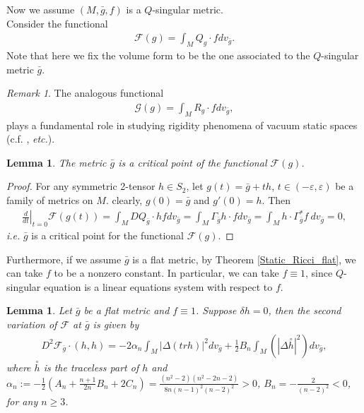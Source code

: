 \documentclass[12pt]{amsart}
\newtheorem{lemma}[theorem]{Lemma}
\theoremstyle{definition}
\theoremstyle{remark}
\newtheorem{remark}[theorem]{Remark}
\numberwithin{equation}{section}
\begin{document}
Now we assume $(M,\bar{g}, f)$ is a $Q$-singular metric.\\

Consider the functional
\begin{align*}
\mathscr{F}(g)=\int_M Q_g \cdot f dv_{\bar{g}}.
\end{align*}
Note that here we fix the volume form to be the one associated to the $Q$-singular metric $\bar{g}$.\\

\begin{remark}
The analogous functional
\begin{align*}
\mathscr{G}(g)=\int_M R_g \cdot f dv_{\bar{g}},
\end{align*}
plays a fundamental role in studying rigidity phenomena of vacuum static spaces (c.f. \cite{F-M, B-M, Q-Y_1}, \emph{etc.}).
\end{remark}

\begin{lemma}
The metric $\bar{g}$ is a critical point of the functional $\mathscr{F}(g)$.
\end{lemma}

\begin{proof}
For any symmetric 2-tensor $h \in S_2$, let $g(t) = \bar{g} + t h$, $t \in (-\varepsilon, \varepsilon)$ be a family of metrics on $M$. clearly, $g(0) = \bar{g}$ and $g'(0) = h$. Then
\begin{align*}
\left. \frac{d}{dt}\right|_{t=0} \mathscr{F}(g(t)) = \int_M DQ_{\bar{g}} \cdot h f dv_{\bar{g}} = \int_M \Gamma_{\bar{g}} h \cdot f dv_{\bar{g}} = \int_M h \cdot \Gamma_{\bar{g}}^* f \ dv_{\bar{g}} = 0,
\end{align*}
\emph{i.e.} $\bar{g}$ is a critical point for the functional $\mathscr{F}(g)$.
\end{proof}

Furthermore, if we assume $\bar{g}$ is a flat metric, by Theorem \ref{Static_Ricci_flat}, we can take $f$ to be a nonzero constant. In particular, we can take $f \equiv 1$, since $Q$-singular equation is a linear equations system with respect to $f$.\\

\begin{lemma}\label{2nd_variation_flat}
Let $\bar{g}$ be a flat metric and $f \equiv 1$. Suppose $\delta h = 0$, then the second variation of $\mathscr{F}$ at $\bar{g}$ is given by
\begin{align}
D^2 \mathscr{F}_{\bar{g}} \cdot (h,h) = -2 \alpha_n \int_M|\Delta(tr h)|^2 dv_{\bar{g}} + \frac{1}{2}B_n\int_M(|\Delta \overset{\circ}{h}|^2)dv_{\bar{g}},
\end{align}
where $\overset{\circ}{h}$ is the traceless part of $h$ and $\alpha_n := - \frac{1}{2}\left(A_n + \frac{n+1}{2n}B_n + 2C_n \right)= \frac{(n^2 - 2) (n^2 - 2n - 2)}{8n(n-1)^2(n-2)^2} > 0$, $B_n=-\frac{2}{(n-2)^2}< 0$, for any $n \geq 3$.
\end{lemma}
\end{document}
